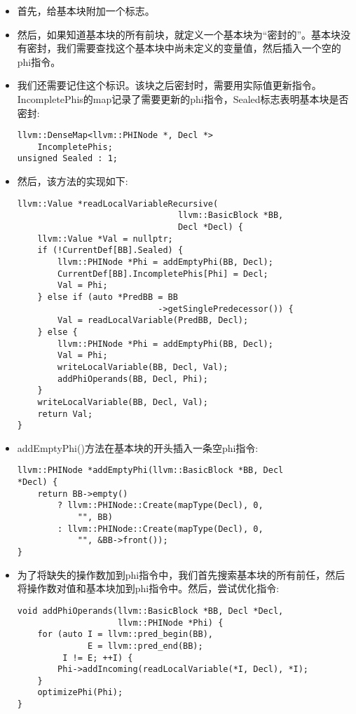 \begin{itemize}
\item 首先，给基本块附加一个标志。
	
\item 然后，如果知道基本块的所有前块，就定义一个基本块为“密封的”。基本块没有密封，我们需要查找这个基本块中尚未定义的变量值，然后插入一个空的phi指令。
	
\item 我们还需要记住这个标识。该块之后密封时，需要用实际值更新指令。IncompletePhis的map记录了需要更新的phi指令，Sealed标志表明基本块是否密封:
\begin{lstlisting}[caption={}]
llvm::DenseMap<llvm::PHINode *, Decl *>
	IncompletePhis;
unsigned Sealed : 1;
\end{lstlisting}

\item 然后，该方法的实现如下:
\begin{lstlisting}[caption={}]
llvm::Value *readLocalVariableRecursive(
								llvm::BasicBlock *BB,
								Decl *Decl) {
	llvm::Value *Val = nullptr;
	if (!CurrentDef[BB].Sealed) {
		llvm::PHINode *Phi = addEmptyPhi(BB, Decl);
		CurrentDef[BB].IncompletePhis[Phi] = Decl;
		Val = Phi;
	} else if (auto *PredBB = BB
							->getSinglePredecessor()) {
		Val = readLocalVariable(PredBB, Decl);
	} else {
		llvm::PHINode *Phi = addEmptyPhi(BB, Decl);
		Val = Phi;
		writeLocalVariable(BB, Decl, Val);
		addPhiOperands(BB, Decl, Phi);
	}
	writeLocalVariable(BB, Decl, Val);
	return Val;
}
\end{lstlisting}

\item addEmptyPhi()方法在基本块的开头插入一条空phi指令:
\begin{lstlisting}[caption={}]
llvm::PHINode *addEmptyPhi(llvm::BasicBlock *BB, Decl
*Decl) {
	return BB->empty()
		? llvm::PHINode::Create(mapType(Decl), 0,
			"", BB)
		: llvm::PHINode::Create(mapType(Decl), 0,
			"", &BB->front());
}
\end{lstlisting}

\item 为了将缺失的操作数加到phi指令中，我们首先搜索基本块的所有前任，然后将操作数对值和基本块加到phi指令中。然后，尝试优化指令:
\begin{lstlisting}[caption={}]
void addPhiOperands(llvm::BasicBlock *BB, Decl *Decl,
					llvm::PHINode *Phi) {
	for (auto I = llvm::pred_begin(BB),
			  E = llvm::pred_end(BB);
		 I != E; ++I) {
		Phi->addIncoming(readLocalVariable(*I, Decl), *I);
	}
	optimizePhi(Phi);
}
\end{lstlisting}

\end{itemize}

